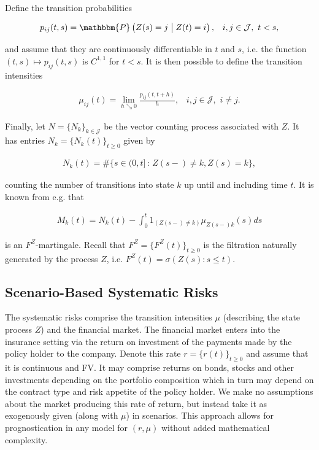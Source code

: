\documentclass{article}
\newcommand{\1}[1]{\mathbbm{1}_{\left\lbrace #1 \right\rbrace}}
\theoremstyle{break}
\theoremstyle{remark}
\numberwithin{equation}{section}
\begin{document}
Define the transition probabilities

\begin{align*}
    p_{ij}(t,s) =  \mathbbm{P} \left( Z(s)=j \;\middle\vert\; Z(t)=i \right), \, \, \, \, \, i,j \in \mathcal{J}, \, \, t < s,
\end{align*}

and assume that they are continuously differentiable in $t$ and $s$, i.e. the function $(t,s) \mapsto p_{ij}(t,s)$ is $C^{1,1}$ for $t < s$. It is then possible to define the transition intensities

\begin{align*}
    \mu_{ij}(t) = \lim_{h \searrow 0} \frac{p_{ij} \left( t,t+h \right)}{h}, \, \, \, \, \, i,j \in \mathcal{J}, \, \, i \neq j.
\end{align*}

Finally, let $N = \{ N_{k} \}_{k \in \mathcal{J}}$ be the vector counting process associated with $Z$. It has entries $N_{k} = \{ N_{k}(t) \}_{t \geq 0}$ given by

\begin{align*}
    N_{k}(t) = \# \{ s \in (0,t] \, : \, Z(s-) \neq k, Z(s)=k \},
\end{align*}

counting the number of transitions into state $k$ up until and including time $t$. It is known from e.g. \cite{LivStok} that

\begin{align*}
    M_{k}(t) = N_{k}(t) - \int_0^t 1_{( Z(s-) \neq k)} \mu_{Z(s-)k}(s)ds
\end{align*}

is an $F^Z$-martingale. Recall that $F^Z= \{ F^Z(t) \}_{t \geq 0}$ is the filtration naturally generated by the process $Z$, i.e. $F^Z(t) = \sigma(Z(s) : s \leq t)$.

\subsection{Scenario-Based Systematic Risks}
The systematic risks comprise the transition intensities $\mu$ (describing the state process $Z$) and the financial market. The financial market enters into the insurance setting via the return on investment of the payments made by the policy holder to the company. Denote this rate $r = \{ r(t) \}_{t \geq 0}$ and assume that it is continuous and FV. It may comprise returns on bonds, stocks and other investments depending on the portfolio composition which in turn may depend on the contract type and risk appetite of the policy holder. We make no assumptions about the market producing this rate of return, but instead take it as exogenously given (along with $\mu$) in scenarios. This approach allows for prognostication in any model for $(r,\mu)$ without added mathematical complexity.
\end{document}
